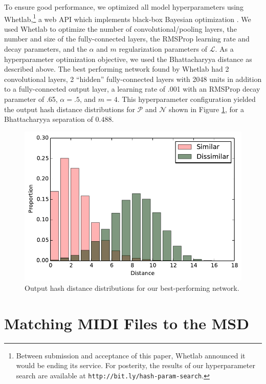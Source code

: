 \documentclass{article}
\begin{document}
To ensure good performance, we optimized all model hyperparameters using Whetlab,\footnote{Between submission and acceptance of this paper, Whetlab announced it would be ending its service.  For posterity, the results of our hyperparameter search are available at \texttt{http://bit.ly/hash-param-search}.} a web API which implements black-box Bayesian optimization \cite{snoek2012practical}.
We used Whetlab to optimize the number of convolutional/pooling layers, the number and size of the fully-connected layers, the RMSProp learning rate and decay parameters, and the $\alpha$ and $m$ regularization parameters of $\mathcal{L}$.
As a hyperparameter optimization objective, we used the Bhattacharyya distance as described above.
The best performing network found by Whetlab had 2 convolutional layers, 2 ``hidden'' fully-connected layers with 2048 units in addition to a fully-connected output layer, a learning rate of .001 with an RMSProp decay parameter of .65, $\alpha = .5$, and $m = 4$.
This hyperparameter configuration yielded the output hash distance distributions for $\mathcal{P}$ and $\mathcal{N}$ shown in Figure \ref{fig:distances}, for a Bhattacharyya separation of $0.488$.

\begin{figure}
  \includegraphics[width=\columnwidth]{hash_distributions.pdf}
  \caption{Output hash distance distributions for our best-performing network.}
  \label{fig:distances}
\end{figure}

\section{Matching MIDI Files to the MSD}
\label{sec:msd}
\end{document}
